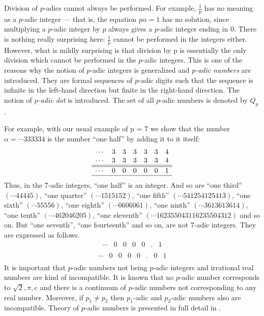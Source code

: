 \documentclass{llncs}
\begin{document}
Division of $p$-adics  cannot always be
performed. For example, $\frac{1}{p}$ has no meaning as a $p$-adic integer — that is, the
equation $p\alpha  = 1$  has no solution, since multiplying a $p$-adic integer by $p$ always
gives a $p$-adic integer ending in $0$. There is nothing really surprising here: $\frac{1}{p}$
cannot be performed in the integers either.
However, what is mildly surprising is that division by p is essentially the only
division which cannot be performed in the $p$-adic integers.  This is one of the reasons why the notion of
$p$-adic integers is generalized and {\em $p$-adic numbers} are introduced. They are formal sequences 
of $p$-adic digits such that the sequence is infinite in the left-hand direction but finite in the
right-hand direction. The notion of {\em $p$-adic dot} is introduced. The set of all $p$-adic numbers is denoted by 
$Q_p$.


For example, with our usual example of p = 7 we show that the number
$\alpha  = \cdots 333334$  is the number “one half” by adding it to it itself:   
$$
\begin{array}{rrrrrrrr|}
\cdots &3&3&3&3&3&4\\
\cdots & 3& 3 &3& 3 & 3& 4\\
\hline
\hline
\cdots &0& 0& 0& 0& 0 & 1 \\
\hline
\end{array}
$$
Thus, in the 7-adic integers, “one half” is an integer. And so are “one third”
$(\cdots 44445)$, “one quarter” $(\cdots 1515152)$, “one fifth” $(\cdots 541254125413)$, “one
sixth” $(\cdots 55556)$, “one eighth” $(\cdots 0606061)$, “one ninth” $(\cdots 3613613614)$, “one
tenth” $(\cdots  462046205)$, “one eleventh” $(\cdots 162355043116235504312)$ and so on.
But “one seventh”, “one fourteenth” and so on, are not 7-adic integers. They are expressed as follows.
$$
\begin{array}{rrrrrrrr|}
\cdots &0&0&0&0&.&1\\
\end{array}
$$
$$
\begin{array}{rrrrrrrrr|}
\cdots &0&0&0&0&.&0&1\\
\end{array}
$$
It is important that $p$-adic numbers not being $p$-adic integers and irrational real numbers are kind of incompatible.
It is known that no $p$-adic number corresponds to $\sqrt{2}, \pi , e$ and there is a continuum of $p$-adic numbers
not corresponding to any real number. Moreover, if $p_1 \neq p_2$ then $p_1$-adic and $p_2$-adic numbers also are
incompatible.
Theory of $p$-adic numbers is presented in full detail in \cite{G83,K84}.
\end{document}
